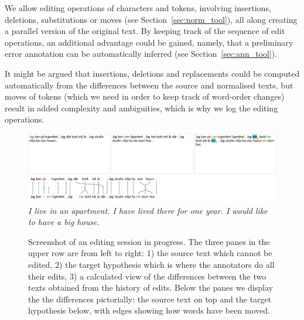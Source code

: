 \documentclass[10pt, a4paper]{article}
\begin{document}
We allow editing operations of characters and tokens, involving insertions, deletions, substitutions %
or moves (see Section~\ref{sec:norm_tool}), all along creating a parallel version of the original text. By keeping track of the sequence of edit operations, an additional advantage could be gained, namely, that a preliminary error annotation can be automatically inferred (see Section~\ref{sec:ann_tool}). %

It might be argued that insertions, deletions and
replacements could be computed automatically from the differences between the source and normalised texts, but moves of tokens (which we need in order to keep track of word-order changes) result in added complexity \cite{ShapiraStorer2007} and ambiguities, which is why we log the editing operations.

\begin{figure}
\includegraphics[width=\textwidth, trim={0 0.6cm 0 0}, clip]{screenshot.pdf}
\emph{\small I live in an apartment. I have lived there for one year. I would like to have a big house.}
\caption{Screenshot of an editing session in progress. The three panes in the upper row are from left to right:
1) the source text which cannot be edited,
2) the target hypothesis which is where the annotators do all their edits,
3) a calculated view of the differences between the two texts obtained from the history of edits.
Below the panes we display the the differences pictorially:
the source text on top and the target hypothesis below, with edges
showing how words have been moved.
\label{fig:screenshot}
}
\end{figure}

\end{document}
